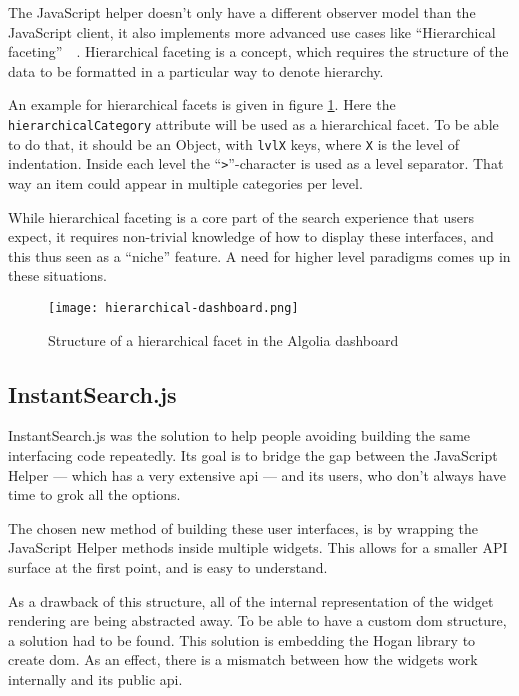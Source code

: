 The JavaScript helper doesn't only have a different observer model than the JavaScript client, it also implements more advanced use cases like ``Hierarchical faceting''~\cite{hierarchical-faceting}~. Hierarchical faceting is a concept, which requires the structure of the data to be formatted in a particular way to denote hierarchy. 

An example for hierarchical facets is given in figure \ref{figure:hierarchical-facets}. Here the {\tt hierarchicalCategory} \gls{attribute} will be used as a hierarchical facet. To be able to do that, it should be an Object, with {\tt lvlX} keys, where {\tt X} is the level of indentation. Inside each level the ``{\tt >}''-character is used as a level separator. That way an item could appear in multiple categories per level.

While hierarchical faceting is a core part of the search experience that users expect, it requires non-trivial knowledge of how to display these interfaces, and this thus seen as a ``niche'' feature. A need for higher level paradigms comes up in these situations.

\begin{figure}[H]
  \centering
  \texttt{[image: hierarchical-dashboard.png]}
  \caption{Structure of a hierarchical facet in the Algolia dashboard}
  \label{figure:hierarchical-facets}
\end{figure}

\subsection{InstantSearch.js} %
\label{sub:instantsearch_js}

InstantSearch.js was the solution to help people avoiding building the same interfacing code repeatedly. Its goal is to bridge the gap between the JavaScript Helper --- which has a very extensive \acrshort{api} --- and its users, who don't always have time to \gls{grok} all the options.

The chosen new method of building these user interfaces, is by wrapping the JavaScript Helper methods inside multiple widgets. This allows for a smaller API surface at the first point, and is easy to understand.

As a drawback of this structure, all of the internal representation of the widget rendering are being abstracted away. To be able to have a custom \acrshort{dom} structure, a solution had to be found. This solution is embedding the Hogan library to create \acrshort{dom}. As an effect, there is a mismatch between how the widgets work internally and its public \acrshort{api}.

